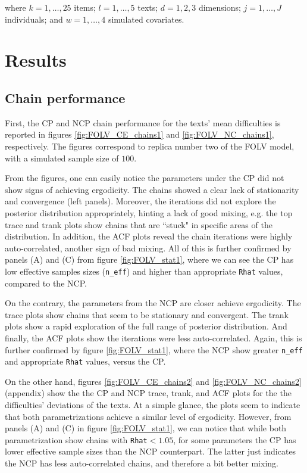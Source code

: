 \noindent where $k= 1, \dots, 25$ items; $l=1, \dots, 5$ texts; $d=1,2,3$ dimensions; $j=1, \dots, J$ individuals; and $w=1, \dots, 4$ simulated covariates.


\section{Results}

\subsection{Chain performance}

First, the CP and NCP chain performance for the texts' mean difficulties is reported in figures \ref{fig:FOLV_CE_chains1} and \ref{fig:FOLV_NC_chains1}, respectively. The figures correspond to replica number two of the FOLV model, with a simulated sample size of $100$. 

From the figures, one can easily notice the parameters under the CP did not show signs of achieving ergodicity. The chains showed a clear lack of stationarity and convergence (left panels). Moreover, the iterations did not explore the posterior distribution appropriately, hinting a lack of good mixing, e.g. the top trace and trank plots show chains that are ``stuck" in specific areas of the distribution. In addition, the ACF plots reveal the chain iterations were highly auto-correlated, another sign of bad mixing. All of this is further confirmed by panels (A) and (C) from figure \ref{fig:FOLV_stat1}, where we can see the CP has low effective samples sizes (\texttt{n\_eff}) and higher than appropriate \texttt{Rhat} values, compared to the NCP.

On the contrary, the parameters from the NCP are closer achieve ergodicity. The trace plots show chains that seem to be stationary and convergent. The trank plots show a rapid exploration of the full range of posterior distribution. And finally, the ACF plots show the iterations were less auto-correlated. Again, this is further confirmed by figure \ref{fig:FOLV_stat1}, where the NCP show greater \texttt{n\_eff} and appropriate \texttt{Rhat} values, versus the CP.

On the other hand, figures \ref{fig:FOLV_CE_chains2} and \ref{fig:FOLV_NC_chains2} (appendix) show the the CP and NCP trace, trank, and ACF plots for the the difficulties' deviations of the texts. At a simple glance, the plots seem to indicate that both parametrizations achieve a similar level of ergodicity. However, from panels (A) and (C) in figure \ref{fig:FOLV_stat1}, we can notice that while both parametrization show chains with \texttt{Rhat}$<1.05$, for some parameters the CP has lower effective sample sizes than the NCP counterpart. The latter just indicates the NCP has less auto-correlated chains, and therefore a bit better mixing.

